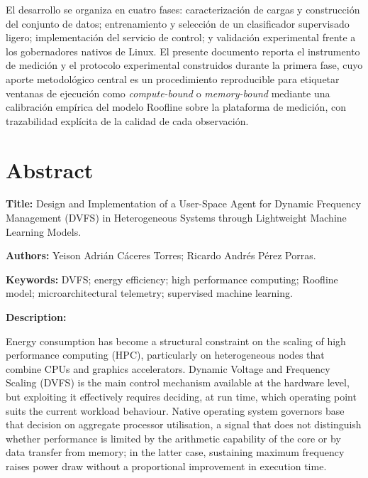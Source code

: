 \documentclass[12pt,oneside,spanish]{book}
\begin{document}
El desarrollo se organiza en cuatro fases: caracterización de cargas y construcción del conjunto de datos; entrenamiento y selección de un clasificador supervisado ligero; implementación del servicio de control; y validación experimental frente a los gobernadores nativos de Linux. El presente documento reporta el instrumento de medición y el protocolo experimental construidos durante la primera fase, cuyo aporte metodológico central es un procedimiento reproducible para etiquetar ventanas de ejecución como \textit{compute-bound} o \textit{memory-bound} mediante una calibración empírica del modelo Roofline sobre la plataforma de medición, con trazabilidad explícita de la calidad de cada observación.



\chapter*{Abstract}

\vspace{1cm}

\noindent\textbf{Title:} Design and Implementation of a User-Space Agent for Dynamic Frequency Management (DVFS) in Heterogeneous Systems through Lightweight Machine Learning Models.

\medskip

\noindent\textbf{Authors:} Yeison Adrián Cáceres Torres; Ricardo Andrés Pérez Porras.

\medskip

\noindent\textbf{Keywords:} DVFS; energy efficiency; high performance computing; Roofline model; microarchitectural telemetry; supervised machine learning.

\vspace{0.5cm}

\noindent\textbf{Description:}

Energy consumption has become a structural constraint on the scaling of high performance computing (HPC), particularly on heterogeneous nodes that combine CPUs and graphics accelerators. Dynamic Voltage and Frequency Scaling (DVFS) is the main control mechanism available at the hardware level, but exploiting it effectively requires deciding, at run time, which operating point suits the current workload behaviour. Native operating system governors base that decision on aggregate processor utilisation, a signal that does not distinguish whether performance is limited by the arithmetic capability of the core or by data transfer from memory; in the latter case, sustaining maximum frequency raises power draw without a proportional improvement in execution time.
\end{document}
